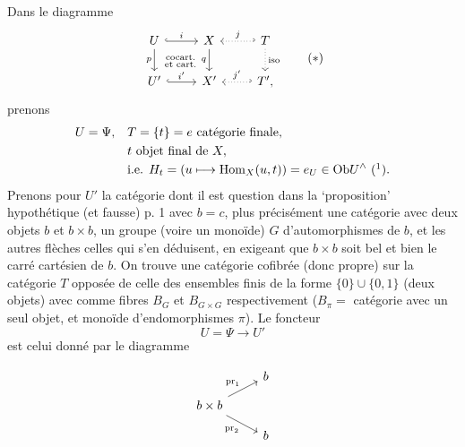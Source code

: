 Dans le diagramme
\[
\begin{tikzcd}
U \arrow[r, hook, "i"] \arrow[d, "p"'] \arrow[dr, phantom, "\substack{\text{cocart.}\\ \text{et cart.}}"] & X \arrow[d, "q"'] & T \arrow[l, hook', dotted, "j"'] \arrow[d, dotted, "\text{iso}"] \\
U' \arrow[r, hook, "i'"] & X' & T', \arrow[l, hook', dotted, "j'"']
\end{tikzcd}
\tag*{$(*)$}
\]
prenons
\[
\begin{aligned}
U = \Psi, \quad & T = \{t\} = e \text{ catégorie finale,}\\
& t \text{ objet final de } X,\\
& \text{i.e. } H_t = (u\longmapsto \Hom_X(u,t)) = e_U \in \Ob U^\wedge \ \mbox{(\footnotemark)}.
\end{aligned}
\]
Prenons pour $U'$ la catégorie dont il est question dans la `proposition' hypothétique (et fausse) p. 1 avec $b = c$, plus précisément une catégorie avec deux objets $b$ et $b\times b$, un groupe (voire un monoïde) $G$ d'automorphismes de $b$, et les autres flèches celles qui s'en déduisent, en exigeant que $b\times b$ soit bel et bien le carré cartésien de $b$. On trouve une catégorie cofibrée (donc propre) sur la catégorie $T$ opposée de celle des ensembles finis de la forme $\{0\}\cup\{0,1\}$ (deux objets) avec comme fibres $B_G$ et $B_{G\times G}$ respectivement ($B_\pi =$ catégorie avec un seul objet, et monoïde d'endomorphismes $\pi$). Le foncteur
\[
U = \Psi \longrightarrow U'
\]
est celui donné par le diagramme

\[
\begin{tikzcd}[row sep=small]
& b \\
b\times b \arrow[ur, "\pr_1"] \arrow[dr, "\pr_2"'] & \\
& b
\end{tikzcd}
\]

